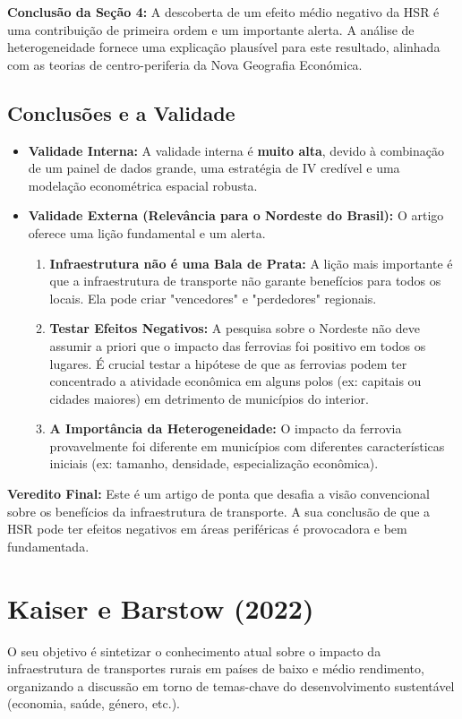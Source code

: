 \documentclass[12pt, a4paper]{article}
\begin{document}
\noindent\textbf{Conclusão da Seção 4:} A descoberta de um efeito médio negativo da HSR é uma contribuição de primeira ordem e um importante alerta. A análise de heterogeneidade fornece uma explicação plausível para este resultado, alinhada com as teorias de centro-periferia da Nova Geografia Económica.

\subsection{Conclusões e a Validade}
\begin{itemize}
    \item \textbf{Validade Interna:} A validade interna é \textbf{muito alta}, devido à combinação de um painel de dados grande, uma estratégia de IV credível e uma modelação econométrica espacial robusta.
    \item \textbf{Validade Externa (Relevância para o Nordeste do Brasil):} O artigo oferece uma lição fundamental e um alerta.
        \begin{enumerate}
            \item \textbf{Infraestrutura não é uma Bala de Prata:} A lição mais importante é que a infraestrutura de transporte não garante benefícios para todos os locais. Ela pode criar "vencedores" e "perdedores" regionais.
            \item \textbf{Testar Efeitos Negativos:} A pesquisa sobre o Nordeste não deve assumir a priori que o impacto das ferrovias foi positivo em todos os lugares. É crucial testar a hipótese de que as ferrovias podem ter concentrado a atividade econômica em alguns polos (ex: capitais ou cidades maiores) em detrimento de municípios do interior.
            \item \textbf{A Importância da Heterogeneidade:} O impacto da ferrovia provavelmente foi diferente em municípios com diferentes características iniciais (ex: tamanho, densidade, especialização econômica). 
        \end{enumerate}
\end{itemize}

\noindent\textbf{Veredito Final:} Este é um artigo de ponta que desafia a visão convencional sobre os benefícios da infraestrutura de transporte. A sua conclusão de que a HSR pode ter efeitos negativos em áreas periféricas é provocadora e bem fundamentada. 

\section{Kaiser e Barstow (2022)}
O seu objetivo é sintetizar o conhecimento atual sobre o impacto da infraestrutura de transportes rurais em países de baixo e médio rendimento, organizando a discussão em torno de temas-chave do desenvolvimento sustentável (economia, saúde, género, etc.).
\end{document}
